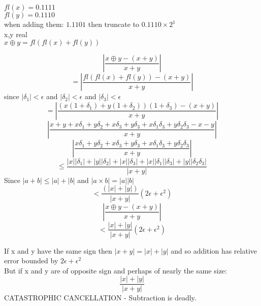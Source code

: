 \documentclass[12pt]{article}
\begin{document}
	$fl(x) = 0.1111$\\
	$fl(y) = 0.1110$\\
	when adding them: $1.1101$ then truncate to $0.1110 \times 2^1$\\
	
	x,y real\\
	$x \oplus y = fl(fl(x) + fl(y))$
	
	$$|\frac{x \oplus y - (x + y)}{x + y}|$$
	$$ = |\frac{fl(fl(x) + fl(y)) - (x + y)}{x + y}|$$
	since $|\delta_1| < \epsilon$ and $|\delta_2| < \epsilon$ and $|\delta_3| < \epsilon$\\
	$$=|\frac{(x(1 + \delta_1) + y(1+\delta_2))(1+\delta_3) - (x+y)}{x + y}|$$
	$$|\frac{x + y + x\delta_1 + y\delta_2 + x\delta_3 + y\delta_3 + x\delta_1\delta_3 + y\delta_2\delta_3 - x - y}{x+y}|$$
	$$|\frac{x\delta_1 + y\delta_2 + x\delta_3 + y\delta_3 + x\delta_1\delta_3 + y\delta_2\delta_3}{x+y}|$$
	$$\le \frac{|x||\delta_1| + |y||\delta_2| + |x||\delta_3| + |x||\delta_1||\delta_3| + |y||\delta_2\delta_3|}{|x+y|}$$
	Since $|a+b| \le |a|+|b|$ and $|a \times b| = |a||b|$
	$$< \frac{(|x| + |y|)}{|x+y|}(2\epsilon + \epsilon^2)$$
	$$|\frac{x\oplus y - (x+y)}{x+y}|$$
	$$ < \frac{|x| + |y|}{|x+y|}(2\epsilon + \epsilon^2)$$
	
	If x and y have the same sign then $|x + y| = |x| + |y|$ and so addition has relative error bounded by $2\epsilon + \epsilon^2$\\
	
	But if x and y are of opposite sign and perhaps of nearly the same size:
	$$\frac{|x| + |y|}{|x + y|}$$
	CATASTROPHIC CANCELLATION - Subtraction is deadly.
\end{document}
